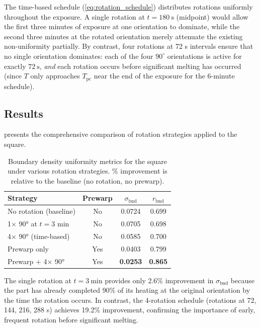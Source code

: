 \documentclass[5p,times]{elsarticle}
\newcommand{\bndstd}{\sigma_{\mathrm{bnd}}}
\newcommand{\Tpc}{T_{\mathrm{pc}}}
\begin{document}
The time-based schedule (\cref{eq:rotation_schedule}) distributes
rotations uniformly throughout the exposure.  A single rotation at
$t = \SI{180}{\second}$ (midpoint) would allow the first three minutes
of exposure at one orientation to dominate, while the second three
minutes at the rotated orientation merely attenuate the existing
non-uniformity partially.  By contrast, four rotations at 72 s
intervals ensure that no single orientation dominates: each of the
four $90^\circ$ orientations is active for exactly $\SI{72}{\second}$,
\textit{and} each rotation occurs before significant melting has
occurred (since $T$ only approaches $\Tpc$ near the end of the
exposure for the 6-minute schedule).

\subsection{Results}

 presents the comprehensive comparison
of rotation strategies applied to the square.

\begin{table}[tb]
\centering
\caption{Boundary density uniformity metrics for the square under
         various rotation strategies.  \% improvement is relative to
         the baseline (no rotation, no prewarp).}
\label{tab:turntable_comparison}
\begin{tabular}{lcSS}
\toprule
Strategy & Prewarp & {$\bndstd$} & {$r_{\mathrm{bnd}}$} \\
\midrule
No rotation (baseline) & No  & 0.0724 & 0.699 \\
1$\times$ 90° at $t=3$ min & No  & 0.0705 & 0.698 \\
4$\times$ 90° (time-based) & No  & 0.0585 & 0.700 \\
Prewarp only            & Yes & 0.0403 & 0.799 \\
Prewarp + 4$\times$ 90° & Yes & \textbf{0.0253} & \textbf{0.865} \\
\bottomrule
\end{tabular}
\end{table}

The single rotation at $t = \SI{3}{\minute}$ provides only 2.6\%
improvement in $\bndstd$ because the part has already completed 90\%
of its heating at the original orientation by the time the rotation
occurs.  In contrast, the 4-rotation schedule (rotations at 72, 144,
216, 288 s) achieves 19.2\% improvement, confirming the importance of
early, frequent rotation before significant melting.
\end{document}
